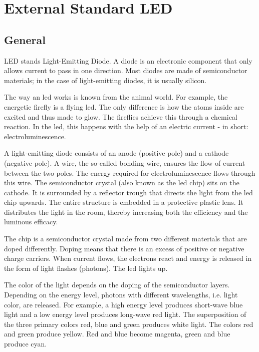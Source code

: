 %
%
%



\chapter{External Standard LED}


\section{General}

LED stands Light-Emitting Diode. A diode is an electronic component that only allows current to pass in one direction. Most diodes are made of semiconductor materials; in the case of light-emitting diodes, it is usually silicon.

The way an \ac{led} works is known from the animal world. For example, the energetic firefly is a flying \ac{led}. The only difference is how the atoms inside are excited and thus made to glow. The fireflies achieve this through a chemical reaction. In the \ac{led}, this happens with the help of an electric current - in short: electroluminescence.

A light-emitting diode consists of an anode (positive pole) and a cathode (negative pole). A wire, the so-called bonding wire, ensures the flow of current between the two poles. The energy required for electroluminescence flows through this wire. The semiconductor crystal (also known as the \ac{led} chip) sits on the cathode. It is surrounded by a reflector trough that directs the light from the \ac{led} chip upwards. The entire structure is embedded in a protective plastic lens. It distributes the light in the room, thereby increasing both the efficiency and the luminous efficacy.

The chip is a semiconductor crystal made from two different materials that are doped differently. Doping means that there is an excess of positive or negative charge carriers. When current flows, the electrons react and energy is released in the form of light flashes (photons). The \ac{led} lights up.

The color of the light depends on the doping of the semiconductor layers. Depending on the energy level, photons with different wavelengths, i.e. light color, are released. For example, a high energy level produces short-wave blue light and a low energy level produces long-wave red light. The superposition of the three primary colors red, blue and green produces white light. The colors red and green produce yellow. Red and blue become magenta, green and blue produce cyan.

